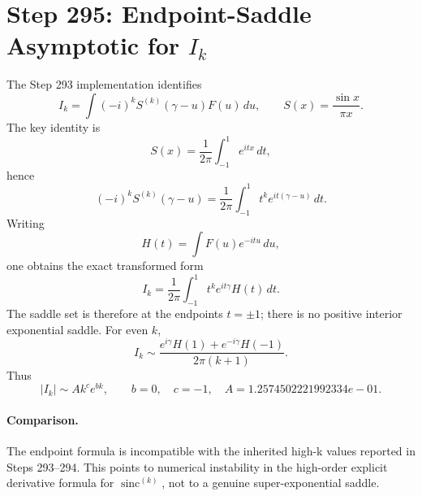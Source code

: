 \section*{Step 295: Endpoint-Saddle Asymptotic for $I_k$}

The Step 293 implementation identifies
\[
 I_k=\int (-i)^k S^{(k)}(\gamma-u)F(u)\,du,\qquad
 S(x)=\frac{\sin x}{\pi x}.
\]
The key identity is
\[
 S(x)=\frac1{2\pi}\int_{-1}^1 e^{itx}\,dt,
\]
hence
\[
 (-i)^kS^{(k)}(\gamma-u)
 =\frac1{2\pi}\int_{-1}^1 t^k e^{it(\gamma-u)}\,dt.
\]
Writing
\[
 H(t)=\int F(u)e^{-itu}\,du,
\]
one obtains the exact transformed form
\[
 I_k=\frac1{2\pi}\int_{-1}^1 t^k e^{it\gamma}H(t)\,dt.
\]
The saddle set is therefore at the endpoints $t=\pm1$; there is no positive
interior exponential saddle.  For even $k$,
\[
 I_k\sim \frac{e^{i\gamma}H(1)+e^{-i\gamma}H(-1)}{2\pi(k+1)}.
\]
Thus
\[
 |I_k|\sim A k^c e^{bk},\qquad
 b=0,\quad c=-1,\quad
 A=1.2574502221992334e-01.
\]

\paragraph{Comparison.}
The endpoint formula is incompatible with the inherited high-k values
reported in Steps 293--294.  This points to numerical instability in the
high-order explicit derivative formula for $\operatorname{sinc}^{(k)}$,
not to a genuine super-exponential saddle.
